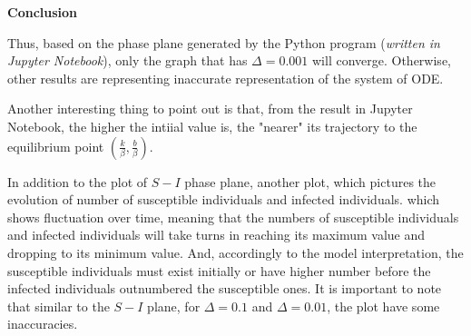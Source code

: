 \documentclass[../main.tex]{subfiles}
\begin{document}
    \begin{flushleft}
        \textbf{Conclusion}
    \end{flushleft}
    
    \begin{flushleft}
        Thus, based on the phase plane generated by the Python program (\textit{written in Jupyter Notebook}), only the graph that has $\Delta = 0.001$ will converge. Otherwise, other results are representing inaccurate representation of the system of ODE.
    \end{flushleft}
    \begin{flushleft}
        Another interesting thing to point out is that, from the result in Jupyter Notebook, the higher the intiial value is, the "nearer" its trajectory to the equilibrium point $(\frac{k}{\beta}, \frac{b}{\beta})$.
    \end{flushleft}
    \begin{flushleft}
        In addition to the plot of $S-I$ phase plane, another plot, which pictures the evolution of number of susceptible individuals and infected individuals. which shows fluctuation over time, meaning that the numbers of susceptible individuals and infected individuals will take turns in reaching its maximum value and dropping to its minimum value. And, accordingly to the model interpretation, the susceptible individuals must exist initially or have higher number before the infected individuals outnumbered the susceptible ones. It is important to note that similar to the $S-I$ plane, for $\Delta = 0.1$ and $\Delta = 0.01$, the plot have some inaccuracies.
    \end{flushleft}
    
    
\end{document}
